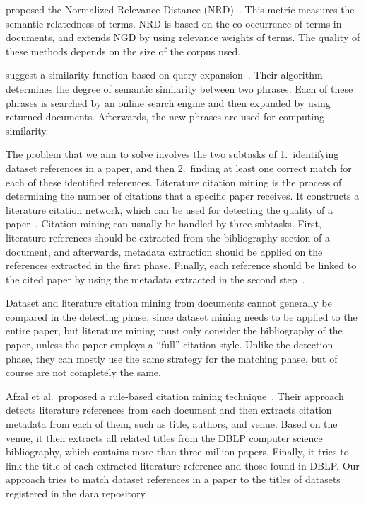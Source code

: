\documentclass{IOS-Book-Article}
\newcommand{\dara}{\textsf{da\textbar ra}}
\begin{document}
\citeauthor{Schaefer2014} proposed the Normalized Relevance Distance (NRD)~\citeyearpar{Schaefer2014}.
This metric measures the semantic relatedness of terms.
NRD is based on the co-occurrence of terms in documents, and extends NGD by using relevance weights of terms.
The quality of these methods depends on the size of the corpus used.

\citeauthor{Sahami2006} suggest a similarity function based on query expansion~\citeyearpar{Sahami2006}.
Their algorithm determines the degree of semantic similarity between two phrases.
Each of these phrases is searched by an online search engine and then expanded by using returned documents.
Afterwards, the new phrases are used for computing similarity. 

The problem that we aim to solve involves the two subtasks of 1.\ identifying dataset references in a paper, and then 2.\ finding at least one correct match for each of these identified references.
Literature citation mining is the process of determining the number of citations that a specific paper receives.
It constructs a literature citation network, which can be used for detecting the quality of a paper~\cite{Afzal2010}.
Citation mining can usually be handled by three subtasks.
First, literature references should be extracted from the bibliography section of a document, and afterwards, metadata extraction should be applied on the references extracted in the first phase.
Finally, each reference should be linked to the cited paper by using the metadata extracted in the second step~\cite{Afzal2010}.

Dataset and literature citation mining from documents cannot generally be compared in the detecting phase, since dataset mining needs to be applied to the entire paper, but literature mining must only consider the bibliography of the paper, unless the paper employs a “full” citation style.
Unlike the detection phase, they can mostly use the same strategy for the matching phase, but of course are not completely the same. 

Afzal et al.\ proposed a rule-based citation mining technique~\cite{Afzal2010}.
Their approach detects literature references from each document and then extracts citation metadata from each of them, such as title, authors, and venue. Based on the venue, it then extracts all related titles from the DBLP computer science bibliography, which contains more than three million papers.
Finally, it tries to link the title of each extracted literature reference and those found in DBLP.
Our approach tries to match dataset references in a paper to the titles of datasets registered in the {\dara} repository.
\end{document}
